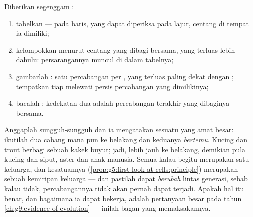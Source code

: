 \begin{method}\label{met:g6:classification-kinship:build}
Diberikan segenggam :
\begin{enumerate}
  \item tabelkan  ---  pada baris,  yang dapat
        diperiksa pada lajur, centang di tempat ia dimiliki;
  \item kelompokkan menurut centang yang dibagi bersama,  yang
        terluas lebih dahulu: persarangannya muncul di dalam tabelnya;
  \item gambarlah : satu percabangan per , yang terluas
        paling dekat dengan ; tempatkan tiap  melewati
        persis percabangan yang  dimilikinya;
  \item bacalah : kedekatan dua  adalah
        percabangan terakhir yang dibaginya bersama.
\end{enumerate}
\end{method}

\begin{remark}\label{rem:g6:classification-kinship:implies}
Anggaplah  sungguh-sungguh dan ia mengatakan sesuatu yang amat
besar: ikutilah dua cabang mana pun ke belakang dan keduanya
\emph{bertemu}. Kucing dan  trout berbagi sebuah  kakek
buyut; jadi, lebih jauh ke belakang, demikian pula kucing dan siput,
 aster dan anak manusia. Semua  kalau begitu
merupakan satu keluarga, dan kesatuannya
(\cref{prop:g5:first-look-at-cells:principle}) merupakan sebuah
kemiripan keluarga --- dan  pastilah dapat \emph{berubah}
lintas generasi, sebab kalau tidak, percabangannya tidak akan pernah
dapat terjadi. Apakah hal itu benar, dan bagaimana ia dapat bekerja,
adalah pertanyaan besar pada tahun
\cref{ch:g9:evidence-of-evolution} ---  inilah bagan yang
memaksakannya.
\end{remark}

